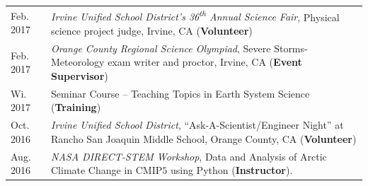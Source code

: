 \documentclass[margin,line,palatino,courier,10pt]{res}
\begin{document}
\begin{resume}
\begin{tabular}{@{}p{0.9in}p{4in}}
Feb. 2017 & \textit{Irvine Unified School District's 36\textsuperscript{th} Annual Science Fair}, Physical science project judge, Irvine, CA (\textbf{Volunteer})\\
Feb. 2017 & \textit{Orange County Regional Science Olympiad}, Severe Storms-Meteorology exam writer and proctor, Irvine, CA (\textbf{Event Supervisor})\\
Wi. 2017 & Seminar Course -- Teaching Topics in Earth System Science (\textbf{Training})\\
Oct. 2016 & \textit{Irvine Unified School District}, ``Ask-A-Scientist/Engineer Night'' at Rancho San Joaquin Middle School, Orange County, CA (\textbf{Volunteer})\\
Aug. 2016 & \textit{NASA DIRECT-STEM Workshop}, Data and Analysis of Arctic Climate Change in CMIP$5$ using Python (\textbf{Instructor}).\\
\end{tabular}

\noindent\textcolor{MidnightBlue}{\makebox[\linewidth][r]{\rule{\textwidth}{5pt}}}

\end{resume}
\end{document}
